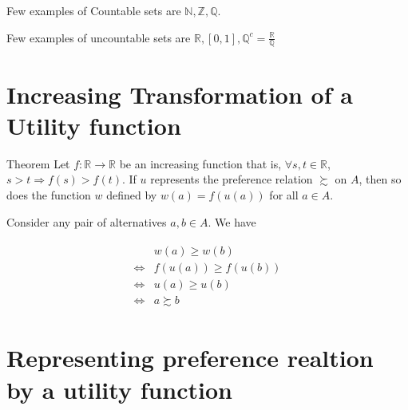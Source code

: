 \documentclass[12pt,a4paper,fleqn]{article}
\begin{document}
  Few examples of Countable sets are \(\mathbb{N}, \mathbb{Z}, \mathbb{Q}\).
  
  Few examples of uncountable sets are \(\mathbb{R}, [0,1], \mathbb{Q}^{c}=\frac{\mathbb{R}}{\mathbb{Q}}\)  
   \pagebreak

   \section{Increasing Transformation of a Utility function} 

   Theorem
Let \(f: \mathbb{R} \rightarrow \mathbb{R}\) be an increasing function that is, \(\forall s, t \in \mathbb{R}\), \(s>t \Rightarrow f(s)>f(t)\). If \(u\) represents the preference relation \(\succsim \) on \(A\), then so does the function \(w\) defined by \(w(a)=f(u(a))\) for all \(a \in A\).

Consider any pair of alternatives \(a, b \in A\). We have

\begin{align*}
\begin{aligned}
& w(a) \geq w(b) \\
\Leftrightarrow & f(u(a)) \geq f(u(b)) \\
\Leftrightarrow & u(a) \geq u(b) \\
\Leftrightarrow & a \succsim b
\end{aligned}
\end{align*}

 \section{Representing preference realtion by a utility function} 
\end{document}
